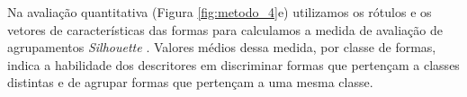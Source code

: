 Na avaliação quantitativa (Figura \ref{fig:metodo_4}e) utilizamos os rótulos e os vetores de características das formas para calculamos a medida de avaliação de agrupamentos \emph{Silhouette} \cite{Rousseeuw:1987}. Valores médios dessa medida, por classe de formas, indica a habilidade dos descritores em discriminar formas que pertençam a classes distintas e de agrupar formas que pertençam a uma mesma classe.
\begin{comment}

\section{Fusão de características}

Conforme ilustra a Figura \ref{fig:features1} contruímos três bases de dados de vetores de características multiescala a partir das formas da base da Figura \ref{fig:db1}. A aplicação da técnica PCA às características multiescala possibilita obter como saída vetores de componentes descorrelacionadas e de máxima variância (citar). 

\begin{figure}[h!]
  \caption{\label{fig:features1} Metodologia que emprega a técnicas \emph{PCA} para obtenção de um descritor híbrido através da fusão de descritores multiescala.}
  \centering
  \texttt{[image: features1.eps]}
\end{figure}

\begin{figure}[h!]
  \caption{\label{fig:acuracia} Acurácia média por classe aferida nos experimentos de recuperação de formas pelo conteúdo, com a base Kimia-99, para os descritores (a) Dimensão fractal multiescala; (b) Energia de dobramento multiescala.}
  \centering
  \texttt{[image: resultado\_acuracia.eps]}
\end{figure}

\end{comment}

\color{black}
\begin{comment}
\section{Bases de imagens}
\end{comment}
\begin{comment}
\begin{figure}
\centering
\caption{\label{Met:1}Metodologia 1}
\texttt{[image: Metodologia1.eps]}
\end{figure}

\begin{figure}
\centering
\caption{\label{Met:2}Metodologia 2}
\texttt{[image: figura\_metodo.eps]}
\end{figure}
\end{comment}